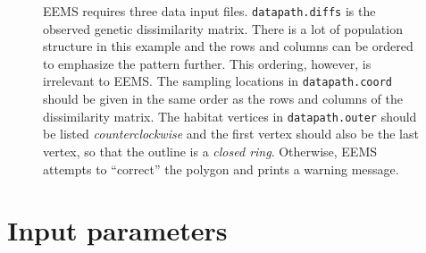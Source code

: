 \documentclass[a4paper,10pt,DIV=15,titlepage,mpinclude=true]{scrartcl}
\newcommand{\keystring}[1]{{\tt #1}}
\begin{document}
{\begin{figure}
\caption[The input data -- an example]{EEMS requires three data input files. 
 \keystring{datapath.diffs} is the observed genetic dissimilarity matrix. There is a lot of population structure in this example and the rows and columns can be ordered to emphasize the pattern further. This ordering, however, is irrelevant to EEMS. 
 The sampling locations in \keystring{datapath.coord} should be given in the same order as the rows and columns of the dissimilarity matrix. 
 The habitat vertices in \keystring{datapath.outer} should be listed \textit{counterclockwise} and the first vertex should also be the last vertex, so that the outline is a \textit{closed ring}. Otherwise, EEMS attempts to ``correct'' the polygon and prints a warning message.}
\label{fig:wang_etal2012-nIndiv314-irregular-habitat:input}
\end{figure}
\clearpage}

\newpage

\section{Input parameters}
\end{document}
